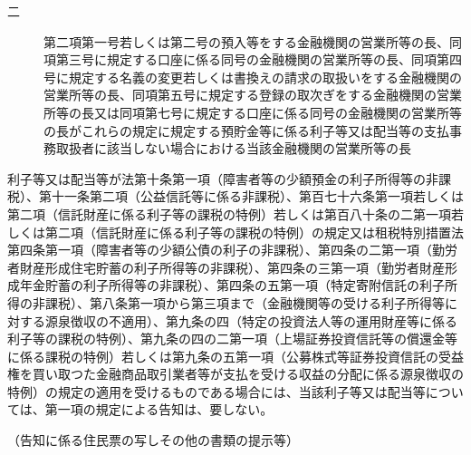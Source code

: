 \documentclass[twocolumn,a4j,10pt]{ltjtarticle}
\begin{document}
\begin{description}
\begin{description}
\item[二]第二項第一号若しくは第二号の預入等をする金融機関の営業所等の長、同項第三号に規定する口座に係る同号の金融機関の営業所等の長、同項第四号に規定する名義の変更若しくは書換えの請求の取扱いをする金融機関の営業所等の長、同項第五号に規定する登録の取次ぎをする金融機関の営業所等の長又は同項第七号に規定する口座に係る同号の金融機関の営業所等の長がこれらの規定に規定する預貯金等に係る利子等又は配当等の支払事務取扱者に該当しない場合における当該金融機関の営業所等の長
\end{description}
\item[\rensuji{6}]利子等又は配当等が法第十条第一項（障害者等の少額預金の利子所得等の非課税）、第十一条第二項（公益信託等に係る非課税）、第百七十六条第一項若しくは第二項（信託財産に係る利子等の課税の特例）若しくは第百八十条の二第一項若しくは第二項（信託財産に係る利子等の課税の特例）の規定又は租税特別措置法第四条第一項（障害者等の少額公債の利子の非課税）、第四条の二第一項（勤労者財産形成住宅貯蓄の利子所得等の非課税）、第四条の三第一項（勤労者財産形成年金貯蓄の利子所得等の非課税）、第四条の五第一項（特定寄附信託の利子所得の非課税）、第八条第一項から第三項まで（金融機関等の受ける利子所得等に対する源泉徴収の不適用）、第九条の四（特定の投資法人等の運用財産等に係る利子等の課税の特例）、第九条の四の二第一項（上場証券投資信託等の償還金等に係る課税の特例）若しくは第九条の五第一項（公募株式等証券投資信託の受益権を買い取つた金融商品取引業者等が支払を受ける収益の分配に係る源泉徴収の特例）の規定の適用を受けるものである場合には、当該利子等又は配当等については、第一項の規定による告知は、要しない。
\end{description}
\noindent\hspace{10pt}（告知に係る住民票の写しその他の書類の提示等）
\end{document}
